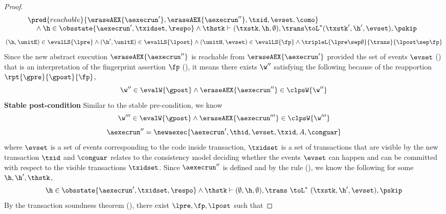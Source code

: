 \begin{proof}
\begin{equation}
\label{equ:reachable}
\begin{array}{@{}l}
    \pred{reachable}{\eraseAEX{\aexecrun'}, \eraseAEX{\aexecrun''}, \txid, \evset, \como} \\
    \quad {} \land \h \in \obsstate{\aexecrun', \txidset, \respo} \land \thstk \vdash (\txstk, \h, \emptyset), \trans \toL^{*} (\txstk', \h', \evset ), \pskip
\end{array}
\end{equation}
\begin{equation}
\label{equ:local-transfer}
    (\h, \unitE) \in \evalLS{\lpre} 
    \land (\h', \unitE) \in \evalLS{\lpost} 
    \land (\unitH, \evset ) \in \evalLS{\fp}
    \land \tripleL{\lpre \sep \emptyset}{\trans}{\lpost \sep \fp}
\end{equation}
Since the new abstract execution \( \eraseAEX{\aexecrun''} \) is reachable from \( \eraseAEX{\aexecrun'} \) provided the set of events \( \evset \) () that is an interpretation of the fingerprint assertion \( \fp \) (), it means there exists \(  \w'' \) satisfying the following because of the reapportion  \( \rpt{ \gpre }{ \gpost }{ \fp }\),
\[
    \w'' \in \evalW{\gpost} 
    \land \eraseAEX{ \aexecrun'' } \in \clpsW{\w''}
\]
\textbf{Stable post-condition} Similar to the stable pre-condition, we know
\[
    \w''' \in \evalW{\gpost} 
    \land \eraseAEX{ \aexecrun''' } \in \clpsW{\w'''}
\]
\begin{equation}
    \aexecrun'' = \newaexec{\aexecrun', \thid, \evset, \txid, A, \conguar } 
\end{equation}
where \( \evset \) is a set of events corresponding to the code inside transaction, \( \txidset \) is  a set of transactions that are visible by the new transaction \( \txid \) and \( \conguar \) relates to the consistency model deciding whether the events \( \evset \) can happen and can be committed with respect to the visible transactions \( \txidset \).
Since \( \aexecrun'' \) is defined and by the  rule (), we know the following for some \( \h, \h', \thstk \),
\begin{equation}
    \h \in \obsstate{\aexecrun', \txidset, \respo}
    \land \thstk \vdash (\emptyset, \h, \emptyset) , \trans \ \toL^{*} \  (\txstk, \h', \evset) , \pskip 
\end{equation}
By the transaction soundness theorem (), there exist \( \lpre, \fp, \lpost \) such that

\end{proof}
